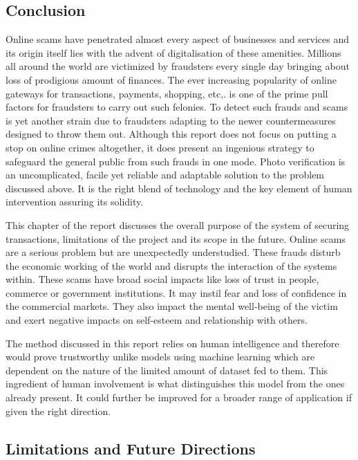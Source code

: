 \documentclass[12pt, oneside, a4paper]{article}
\begin{document}
\subsection{Conclusion}
Online scams have penetrated almost every aspect of businesses and services and its origin itself lies with the advent of digitalisation of these amenities. Millions all around the world are victimized by fraudsters every single day bringing about loss of prodigious amount of finances. The ever increasing popularity of online gateways for transactions, payments, shopping, etc,. is one of the prime pull factors for fraudsters to carry out such felonies. To detect such frauds and scams is yet another strain due to fraudsters adapting to the newer countermeasures designed to throw them out. Although this report does not focus on putting a stop on online crimes altogether, it does present an ingenious strategy to safeguard the general public from such frauds in one mode. Photo verification is an uncomplicated, facile yet reliable and adaptable solution to the problem discussed above. It is the right blend of technology and the key element of human intervention assuring its solidity.

This chapter of the report discusses the overall purpose of the system of securing transactions, limitations of the project and its scope in the future. Online scams are a serious problem but are unexpectedly understudied. These frauds disturb the economic working of the world and disrupts the interaction of the systems within. These scams have broad social impacts like loss of trust in people, commerce or government institutions. It may instil fear and loss of confidence in the commercial markets. They also impact the mental well-being of the victim and exert negative impacts on self-esteem and relationship with others.

The method discussed in this report relies on human intelligence and therefore would prove trustworthy unlike models using machine learning which are dependent on the nature of the limited amount of dataset fed to them. This ingredient of human involvement is what distinguishes this model from the ones already present. It could further be improved for a broader range of application if given the right direction.

\pagebreak

\subsection{Limitations and Future Directions}
\vspace{0.5cm}
\end{document}

